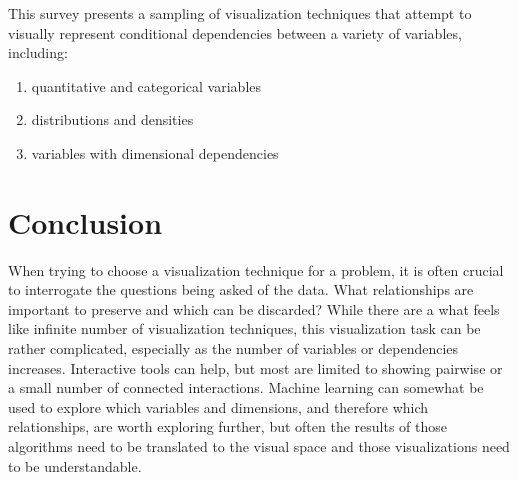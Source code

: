 \documentclass[letterpaper,onecolumn,titlepage]{Ythesis}
\begin{document}



This survey presents a sampling of visualization techniques that attempt to visually represent conditional dependencies between a variety of variables, including:
\begin{enumerate}
	\item quantitative and categorical variables
	\item distributions and densities
	\item variables with dimensional dependencies
\end{enumerate}








\section{Conclusion}
\label{sec:conclusion}
When trying to choose a visualization technique for a problem, it is often
crucial to interrogate the questions being asked of the data. What
relationships are important to preserve and which can be discarded? While there
are a what feels like infinite number of visualization techniques, this
visualization task can be rather complicated, especially as the number of
variables or dependencies increases. Interactive tools can help, but most are limited to showing pairwise or a small number of connected interactions. Machine learning can somewhat be used
to explore which variables and dimensions, and therefore which relationships, are worth
exploring further, but often the results of those algorithms need to
be translated to the visual space and those visualizations need to be
understandable. 


\printbibliography
\end{document}
